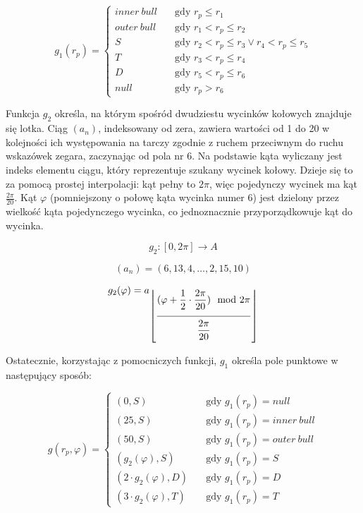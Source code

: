 \[
g_1(r_p) = 
     \begin{cases}
       inner\ bull &\quad\text{gdy } r_p \le r_1 \\
       outer\ bull &\quad\text{gdy } r_1 < r_p \le r_2 \\
       S &\quad\text{gdy } r_2 < r_p \le r_3 \lor r_4 < r_p \le r_5 \\
       T &\quad\text{gdy } r_3 < r_p \le r_4 \\
       D &\quad\text{gdy } r_5 < r_p \le r_6 \\
       null &\quad\text{gdy } r_p > r_6
     \end{cases}
\]

Funkcja $g_2$ określa, na którym spośród dwudziestu wycinków kołowych znajduje się lotka. Ciąg $(a_n)$, indeksowany od zera, zawiera wartości od 1 do 20 w kolejności ich występowania na tarczy zgodnie z ruchem przeciwnym do ruchu wskazówek zegara, zaczynając od pola nr 6. Na podstawie kąta wyliczany jest indeks elementu ciągu, który reprezentuje szukany wycinek kołowy. Dzieje się to za pomocą prostej interpolacji: kąt pełny to $2\pi$, więc pojedynczy wycinek ma kąt $\frac{2\pi}{20}$. Kąt $\varphi$ (pomniejszony o połowę kąta wycinka numer 6) jest dzielony przez wielkość kąta pojedynczego wycinka, co jednoznacznie przyporządkowuje kąt do wycinka.

\[
g_2: [0, 2\pi] \to A
\]

\[
(a_n) = (6, 13, 4, \ldots, 2, 15, 10)
\]

\[
g_2(\varphi) = a_{\left \lfloor{\myfrac[13pt]{\displaystyle (\varphi + \frac{1}{2} \cdot \frac{2\pi}{20}) \mod 2\pi}{\displaystyle \frac{2\pi}{20}}}\right \rfloor}
\]

Ostatecznie, korzystając z pomocniczych funkcji, $g_1$ określa pole punktowe w następujący sposób:

\[
g(r_p, \varphi) = 
     \begin{cases}
       (0, S) &\quad\text{gdy } g_1(r_p) = null \\
       (25, S) &\quad\text{gdy } g_1(r_p) = inner\ bull \\
       (50, S) &\quad\text{gdy } g_1(r_p) = outer\ bull \\
       (g_2(\varphi), S) &\quad\text{gdy } g_1(r_p) = S \\
       (2 \cdot g_2(\varphi), D) &\quad\text{gdy } g_1(r_p) = D \\
       (3 \cdot g_2(\varphi), T) &\quad\text{gdy } g_1(r_p) = T
     \end{cases}
\]
\begin{figure}[h!]
\begin{center}

\end{center}
\label{tarcza_promienie}
\end{figure} 